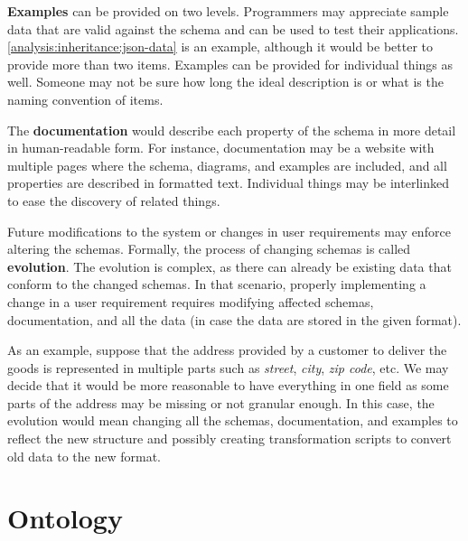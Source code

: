 \textbf{Examples} can be provided on two levels. Programmers may appreciate sample data that are valid against the schema and can be used to test their applications. \autoref{analysis:inheritance:json-data} is an example, although it would be better to provide more than two items. Examples can be provided for individual things as well. Someone may not be sure how long the ideal description is or what is the naming convention of items.

The \textbf{documentation} would describe each property of the schema in more detail in human-readable form. For instance, documentation may be a website with multiple pages where the schema, diagrams, and examples are included, and all properties are described in formatted text. Individual things may be interlinked to ease the discovery of related things.

\bigskip

Future modifications to the system or changes in user requirements may enforce altering the schemas. Formally, the process of changing schemas is called \textbf{evolution}. The evolution is complex, as there can already be existing data that conform to the changed schemas. In that scenario, properly implementing a change in a user requirement requires modifying affected schemas, documentation, and all the data (in case the data are stored in the given format).

\begin{showcase}
    As an example, suppose that the address provided by a customer to deliver the goods is represented in multiple parts such as \textit{street}, \textit{city}, \textit{zip code}, etc. We may decide that it would be more reasonable to have everything in one field as some parts of the address may be missing or not granular enough. In this case, the evolution would mean changing all the schemas, documentation, and examples to reflect the new structure and possibly creating transformation scripts to convert old data to the new format.
\end{showcase}

\section*{Ontology}

